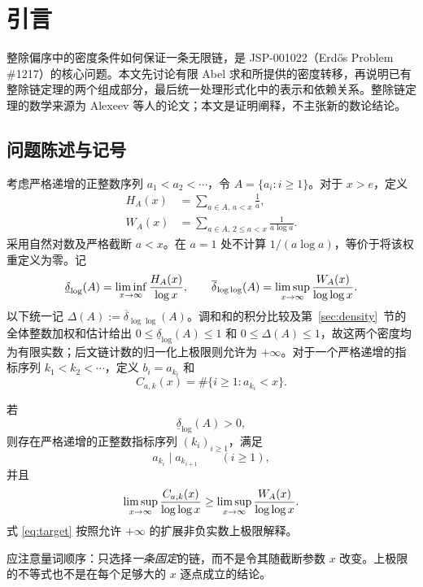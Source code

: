 \section{引言}
整除偏序中的密度条件如何保证一条无限链，是 JSP-001022（Erdős Problem \#1217）的核心问题。本文先讨论有限 Abel 求和所提供的密度转移，再说明已有整除链定理的两个组成部分，最后统一处理形式化中的表示和依赖关系。整除链定理的数学来源为 Alexeev 等人的论文\cite{alexeev2026}；本文是证明阐释，不主张新的数论结论。

\subsection{问题陈述与记号}
考虑严格递增的正整数序列 $a_1<a_2<\cdots$，令 $A=\{a_i:i\ge1\}$。对于 $x>e$，定义
\begin{align}
H_A(x)&=\sum_{a\in A,\,a<x}\frac1a,\\
W_A(x)&=\sum_{a\in A,\,2\le a<x}\frac1{a\log a}.
\end{align}
采用自然对数及严格截断 $a<x$。在 $a=1$ 处不计算 $1/(a\log a)$，等价于将该权重定义为零。记
\begin{equation}\label{eq:densities}
\underline\delta_{\log}(A)=\liminf_{x\to\infty}\frac{H_A(x)}{\log x},\qquad
\overline\delta_{\log\log}(A)=\limsup_{x\to\infty}\frac{W_A(x)}{\log\log x}.
\end{equation}
以下统一记 $\Delta(A):=\overline\delta_{\log\log}(A)$。调和和的积分比较及第~\ref{sec:density}~节的全体整数加权和估计给出
$0\le\underline\delta_{\log}(A)\le1$ 和 $0\le\Delta(A)\le1$，故这两个密度均为有限实数；后文链计数的归一化上极限则允许为 $+\infty$。对于一个严格递增的指标序列 $k_1<k_2<\cdots$，定义 $b_i=a_{k_i}$ 和
\begin{equation}
C_{a,k}(x)=\#\{i\ge1:a_{k_i}<x\}.
\end{equation}
\begin{theorem}\label{thm:main}
若
\begin{equation}\label{eq:assumption}
\underline\delta_{\log}(A)>0,
\end{equation}
则存在严格递增的正整数指标序列 $(k_i)_{i\ge1}$，满足
\begin{equation}\label{eq:divides}
a_{k_i}\mid a_{k_{i+1}}\qquad(i\ge1),
\end{equation}
并且
\begin{equation}\label{eq:target}
\limsup_{x\to\infty}\frac{C_{a,k}(x)}{\log\log x}
\ge\limsup_{x\to\infty}\frac{W_A(x)}{\log\log x}.
\end{equation}
式 \eqref{eq:target} 按照允许 $+\infty$ 的扩展非负实数上极限解释。
\end{theorem}
应注意量词顺序：只选择\emph{一条固定}的链，而不是令其随截断参数 $x$ 改变。上极限的不等式也不是在每个足够大的 $x$ 逐点成立的结论。


